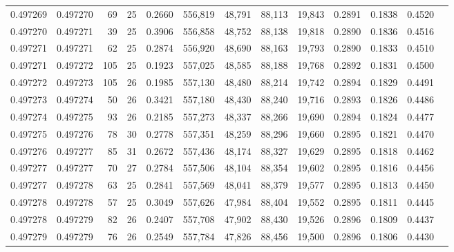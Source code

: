 \begin{tabular}{rrrrrrrrrrrrr}
0.497269 & 0.497270 &  69 &  25 &                                     0.2660 & 556,819 &  48,791 &  88,113 &  19,843 & 0.2891 & 0.1838 & 0.4520 \\
0.497270 & 0.497271 &  39 &  25 &                                     0.3906 & 556,858 &  48,752 &  88,138 &  19,818 & 0.2890 & 0.1836 & 0.4516 \\
0.497271 & 0.497271 &  62 &  25 &                                     0.2874 & 556,920 &  48,690 &  88,163 &  19,793 & 0.2890 & 0.1833 & 0.4510 \\
0.497271 & 0.497272 & 105 &  25 &                                     0.1923 & 557,025 &  48,585 &  88,188 &  19,768 & 0.2892 & 0.1831 & 0.4500 \\
0.497272 & 0.497273 & 105 &  26 &                                     0.1985 & 557,130 &  48,480 &  88,214 &  19,742 & 0.2894 & 0.1829 & 0.4491 \\
0.497273 & 0.497274 &  50 &  26 &                                     0.3421 & 557,180 &  48,430 &  88,240 &  19,716 & 0.2893 & 0.1826 & 0.4486 \\
0.497274 & 0.497275 &  93 &  26 &                                     0.2185 & 557,273 &  48,337 &  88,266 &  19,690 & 0.2894 & 0.1824 & 0.4477 \\
0.497275 & 0.497276 &  78 &  30 &                                     0.2778 & 557,351 &  48,259 &  88,296 &  19,660 & 0.2895 & 0.1821 & 0.4470 \\
0.497276 & 0.497277 &  85 &  31 &                                     0.2672 & 557,436 &  48,174 &  88,327 &  19,629 & 0.2895 & 0.1818 & 0.4462 \\
0.497277 & 0.497277 &  70 &  27 &                                     0.2784 & 557,506 &  48,104 &  88,354 &  19,602 & 0.2895 & 0.1816 & 0.4456 \\
0.497277 & 0.497278 &  63 &  25 &                                     0.2841 & 557,569 &  48,041 &  88,379 &  19,577 & 0.2895 & 0.1813 & 0.4450 \\
0.497278 & 0.497278 &  57 &  25 &                                     0.3049 & 557,626 &  47,984 &  88,404 &  19,552 & 0.2895 & 0.1811 & 0.4445 \\
0.497278 & 0.497279 &  82 &  26 &                                     0.2407 & 557,708 &  47,902 &  88,430 &  19,526 & 0.2896 & 0.1809 & 0.4437 \\
0.497279 & 0.497279 &  76 &  26 &                                     0.2549 & 557,784 &  47,826 &  88,456 &  19,500 & 0.2896 & 0.1806 & 0.4430 \\

\end{tabular}
